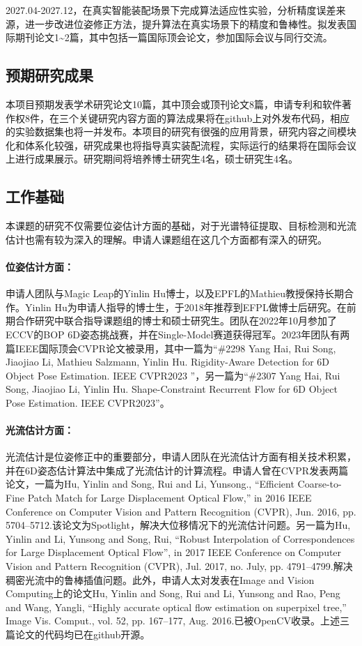 \documentclass[12pt]{article}
\newcommand{\myPara}[1]{\paragraph{#1：}}
\begin{document}
2027.04-2027.12，在真实智能装配场景下完成算法适应性实验，分析精度误差来源，进一步改进位姿修正方法，提升算法在真实场景下的精度和鲁棒性。拟发表国际期刊论文1\textasciitilde2篇，其中包括一篇国际顶会论文，参加国际会议与同行交流。

\subsection{预期研究成果}

本项目预期发表学术研究论文10篇，其中顶会或顶刊论文8篇，申请专利和软件著作权8件，在三个关键研究内容方面的算法成果将在github上对外发布代码，相应的实验数据集也将一并发布。本项目的研究有很强的应用背景，研究内容之间模块化和体系化较强，研究成果也将指导真实装配流程，实际运行的结果将在国际会议上进行成果展示。研究期间将培养博士研究生4名，硕士研究生4名。



\subsection{工作基础}


本课题的研究不仅需要位姿估计方面的基础，对于光谱特征提取、目标检测和光流估计也需有较为深入的理解。申请人课题组在这几个方面都有深入的研究。
\myPara{位姿估计方面}
申请人团队与Magic Leap的Yinlin Hu博士，以及EPFL的Mathieu教授保持长期合作。Yinlin Hu为申请人指导的博士生，于2018年推荐到EFPL做博士后研究。在前期合作研究中联合指导课题组的博士和硕士研究生。团队在2022年10月参加了ECCV的BOP 6D姿态挑战赛，并在Single-Model赛道获得冠军。2023年团队有两篇IEEE国际顶会CVPR论文被录用，其中一篇为“\#2298 Yang Hai, Rui Song, Jiaojiao Li, Mathieu Salzmann, Yinlin Hu. Rigidity-Aware Detection for 6D Object Pose Estimation. IEEE CVPR2023 ”，另一篇为“\#2307 Yang Hai, Rui Song, Jiaojiao Li, Yinlin Hu. Shape-Constraint Recurrent Flow for 6D Object Pose Estimation. IEEE CVPR2023”。

\myPara{光流估计方面}
光流估计是位姿修正中的重要部分，申请人团队在光流估计方面有相关技术积累，并在6D姿态估计算法中集成了光流估计的计算流程。申请人曾在CVPR发表两篇论文，一篇为Hu, Yinlin and Song, Rui and Li, Yunsong., “Efficient Coarse-to-Fine Patch Match for Large Displacement Optical Flow,” in 2016 IEEE Conference on Computer Vision and Pattern Recognition (CVPR), Jun. 2016, pp. 5704–5712.该论文为Spotlight，解决大位移情况下的光流估计问题。另一篇为Hu, Yinlin and Li, Yunsong and Song, Rui, “Robust Interpolation of Correspondences for Large Displacement Optical Flow”, in 2017 IEEE Conference on Computer Vision and Pattern Recognition (CVPR), Jul. 2017, no. July, pp. 4791–4799.解决稠密光流中的鲁棒插值问题。此外，申请人太对发表在Image and Vision Computing上的论文Hu, Yinlin and Song, Rui and Li, Yunsong and Rao, Peng and Wang, Yangli, “Highly accurate optical flow estimation on superpixel tree,” Image Vis. Comput., vol. 52, pp. 167–177, Aug. 2016.已被OpenCV收录。上述三篇论文的代码均已在github开源。
\end{document}

